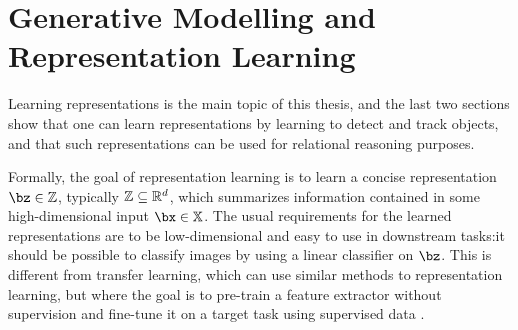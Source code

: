 	


\section{Generative Modelling and Representation Learning}
\label{sec:repr_learning}

	Learning representations is the main topic of this thesis, and the last two sections show that one can learn representations by learning to detect and track objects, and that such representations can be used for relational reasoning purposes.
	
	Formally, the goal of representation learning is to learn a concise representation $\bz \in \mathbb{Z}$, typically $\mathbb{Z} \subseteq \mathbb{R}^d$, which summarizes information contained in some high-dimensional input $\bx \in \mathbb{X}$.
	The usual requirements for the learned representations are to be low-dimensional and easy to use in downstream tasks:\eg it should be possible to classify images by using a linear classifier on $\bz$.
	This is different from transfer learning, which can use similar methods to representation learning, but where the goal is to pre-train a feature extractor without supervision and fine-tune it on a target task using supervised data \citep{He2019moco,Devlin2019bert}.
	
